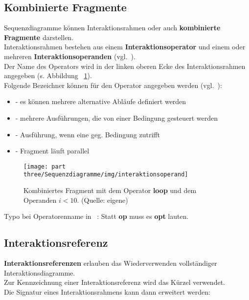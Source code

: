 \subsection{Kombinierte Fragmente}
Sequenzdiagramme können Interaktionsrahmen oder auch \textbf{kombinierte Fragmente} darstellen.\\
Interaktionsrahmen bestehen aus einem \textbf{Interaktionsoperator} und einem oder mehreren \textbf{Interaktionsoperanden} (vgl.~\cite[582]{OMG17}).\\
Der Name des Operators wird in der linken oberen Ecke des Interaktionsrahmen angegeben (s. Abbildung ~\ref{fig:interaktionsoperand}).\\
Folgende Bezeichner können für den Operator angegeben werden (vgl.~\cite[583]{OMG17}):

\begin{itemize}
    \item {} - es können mehrere alternative Abläufe definiert werden
    \item {} - mehrere Ausführungen, die von einer Bedingung gesteuert werden
    \item {} - Ausführung, wenn eine geg. Bedingung zutrifft
    \item {} - Fragment läuft parallel
\end{itemize}

\begin{figure}
    \centering
    \texttt{[image: part three/Sequenzdiagramme/img/interaktionsoperand]}
    \caption{Kombiniertes Fragment mit dem Operator \textbf{loop} und dem Operanden $i < 10$. (Quelle: eigene)}
    \label{fig:interaktionsoperand}
\end{figure}

\begin{tcolorbox}[title=Syntax Antworten,colback=red!20]
    Typo bei Operatorenname in ~\cite[34]{Buh09}:
    Statt \textbf{op} muss es \textbf{opt} lauten.
\end{tcolorbox}

\subsection{Interaktionsreferenz}

\textbf{Interaktionsreferenzen} erlauben das Wiederverwenden vollständiger Interaktionsdiagramme.\\
Zur Kennzeichnung einer Interaktionsreferenz wird das Kürzel  verwendet.\\
Die Signatur eines Interaktionsrahmens kann dann erweitert werden:\\

